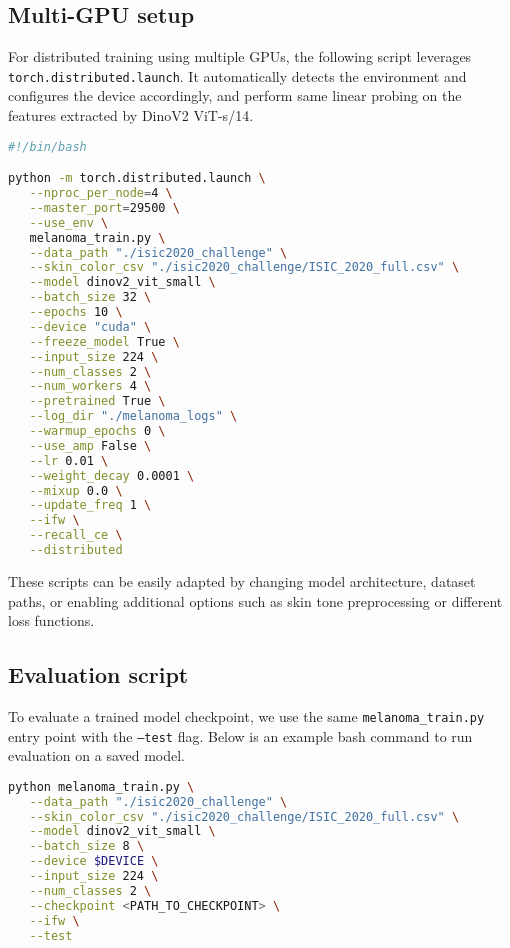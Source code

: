 \subsection{Multi-GPU setup}
For distributed training using multiple GPUs, the following script leverages \texttt{torch.distributed.launch}. It automatically detects the environment and configures the device accordingly, and perform same linear probing on the features extracted by DinoV2 ViT-s/14.

\begin{lstlisting}[language=bash, caption={Example Multi-GPU Training Script}, label={lst:gpu_script}]
#!/bin/bash

python -m torch.distributed.launch \
   --nproc_per_node=4 \
   --master_port=29500 \
   --use_env \
   melanoma_train.py \
   --data_path "./isic2020_challenge" \
   --skin_color_csv "./isic2020_challenge/ISIC_2020_full.csv" \
   --model dinov2_vit_small \
   --batch_size 32 \
   --epochs 10 \
   --device "cuda" \
   --freeze_model True \
   --input_size 224 \
   --num_classes 2 \
   --num_workers 4 \
   --pretrained True \
   --log_dir "./melanoma_logs" \
   --warmup_epochs 0 \
   --use_amp False \
   --lr 0.01 \
   --weight_decay 0.0001 \
   --mixup 0.0 \
   --update_freq 1 \
   --ifw \
   --recall_ce \
   --distributed
\end{lstlisting}

These scripts can be easily adapted by changing model architecture, dataset paths, or enabling additional options such as skin tone preprocessing or different loss functions.

\subsection{Evaluation script}

To evaluate a trained model checkpoint, we use the same \texttt{melanoma\_train.py} entry point with the \texttt{--test} flag. Below is an example bash command to run evaluation on a saved model.

\begin{lstlisting}[language=bash, caption={Example Evaluation Script}, label={lst:evaluation_script}]
python melanoma_train.py \
   --data_path "./isic2020_challenge" \
   --skin_color_csv "./isic2020_challenge/ISIC_2020_full.csv" \
   --model dinov2_vit_small \
   --batch_size 8 \
   --device $DEVICE \
   --input_size 224 \
   --num_classes 2 \
   --checkpoint <PATH_TO_CHECKPOINT> \
   --ifw \
   --test
\end{lstlisting}

